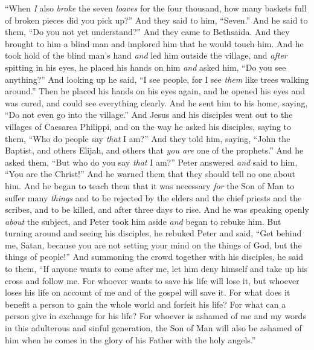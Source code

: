 \begin{biblechapter}
\verse “When \textit{I} also \textit{broke} the seven \textit{loaves} for the four thousand, how many baskets full of broken pieces did you pick up?” And they said to him, “Seven.”
\verse And he said to them, “Do you not yet understand?”
 And they came to Bethsaida. And they brought to him a blind man and implored him that he would touch him.
\verse And he took hold of the blind man’s hand \textit{and} led him outside the village, and \textit{after} spitting in his eyes, he placed his hands on him \textit{and} asked him, “Do you see anything?”
\verse And looking up he said, “I see people, for I see \textit{them} like trees walking around.”
\verse Then he placed his hands on his eyes again, and he opened his eyes and was cured, and could see everything clearly.
\verse And he sent him to his home, saying, “Do not even go into the village.”
 And Jesus and his disciples went out to the villages of Caesarea Philippi, and on the way he asked his disciples, saying to them, “Who do people say \textit{that} I am?”
\verse And they told him, saying, “John the Baptist, and others Elijah, and others that \textit{you are} one of the prophets.”
\verse And he asked them, “But who do you say \textit{that} I am?” Peter answered \textit{and} said to him, “You are the Christ!”
\verse And he warned them that they should tell no one about him.
 And he began to teach them that it was necessary \textit{for} the Son of Man to suffer many \textit{things} and to be rejected by the elders and the chief priests and the scribes, and to be killed, and after three days to rise.
\verse And he was speaking openly \textit{about} the subject, and Peter took him aside \textit{and} began to rebuke him.
\verse But turning around and seeing his disciples, he rebuked Peter and said, “Get behind me, Satan, because you are not setting your mind on the things of God, but the things of people!”
 And summoning the crowd together with his disciples, he said to them, “If anyone wants to come after me, let him deny himself and take up his cross and follow me.
\verse For whoever wants to save his life will lose it, but whoever loses his life on account of me and of the gospel will save it.
\verse For what does it benefit a person to gain the whole world and forfeit his life?
\verse For what can a person give in exchange for his life?
\verse For whoever is ashamed of me and my words in this adulterous and sinful generation, the Son of Man will also be ashamed of him when he comes in the glory of his Father with the holy angels.”
\end{biblechapter}

